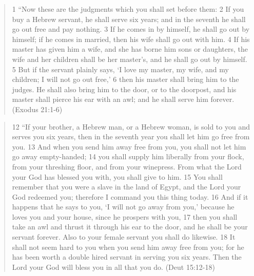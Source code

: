 \documentclass[11pt]{article}
\begin{document}
\begin{quote}
1 “Now these are the judgments which you shall set before them: 2 If you buy a Hebrew servant, he shall serve six years; and in the seventh he shall go out free and pay nothing. 3 If he comes in by himself, he shall go out by himself; if he comes in married, then his wife shall go out with him. 4 If his master has given him a wife, and she has borne him sons or daughters, the wife and her children shall be her master’s, and he shall go out by himself. 5 But if the servant plainly says, ‘I love my master, my wife, and my children; I will not go out free,’ 6 then his master shall bring him to the judges. He shall also bring him to the door, or to the doorpost, and his master shall pierce his ear with an awl; and he shall serve him forever. (Exodus 21:1-6)
\end{quote}

\begin{quote}
12 “If your brother, a Hebrew man, or a Hebrew woman, is sold to you and serves you six years, then in the seventh year you shall let him go free from you. 13 And when you send him away free from you, you shall not let him go away empty-handed; 14 you shall supply him liberally from your flock, from your threshing floor, and from your winepress. From what the Lord your God has blessed you with, you shall give to him. 15 You shall remember that you were a slave in the land of Egypt, and the Lord your God redeemed you; therefore I command you this thing today. 16 And if it happens that he says to you, ‘I will not go away from you,’ because he loves you and your house, since he prospers with you, 17 then you shall take an awl and thrust it through his ear to the door, and he shall be your servant forever. Also to your female servant you shall do likewise. 18 It shall not seem hard to you when you send him away free from you; for he has been worth a double hired servant in serving you six years. Then the Lord your God will bless you in all that you do. (Deut 15:12-18)
\end{quote}
\end{document}
